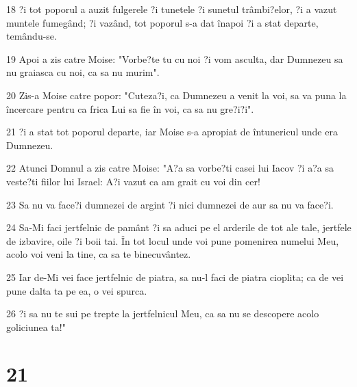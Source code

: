 \par 18 ?i tot poporul a auzit fulgerele ?i tunetele ?i sunetul trâmbi?elor, ?i a vazut muntele fumegând; ?i vazând, tot poporul s-a dat înapoi ?i a stat departe, temându-se.
\par 19 Apoi a zis catre Moise: "Vorbe?te tu cu noi ?i vom asculta, dar Dumnezeu sa nu graiasca cu noi, ca sa nu murim".
\par 20 Zis-a Moise catre popor: "Cuteza?i, ca Dumnezeu a venit la voi, sa va puna la încercare pentru ca frica Lui sa fie în voi, ca sa nu gre?i?i".
\par 21 ?i a stat tot poporul departe, iar Moise s-a apropiat de întunericul unde era Dumnezeu.
\par 22 Atunci Domnul a zis catre Moise: "A?a sa vorbe?ti casei lui Iacov ?i a?a sa veste?ti fiilor lui Israel: A?i vazut ca am grait cu voi din cer!
\par 23 Sa nu va face?i dumnezei de argint ?i nici dumnezei de aur sa nu va face?i.
\par 24 Sa-Mi faci jertfelnic de pamânt ?i sa aduci pe el arderile de tot ale tale, jertfele de izbavire, oile ?i boii tai. În tot locul unde voi pune pomenirea numelui Meu, acolo voi veni la tine, ca sa te binecuvântez.
\par 25 Iar de-Mi vei face jertfelnic de piatra, sa nu-l faci de piatra cioplita; ca de vei pune dalta ta pe ea, o vei spurca.
\par 26 ?i sa nu te sui pe trepte la jertfelnicul Meu, ca sa nu se descopere acolo goliciunea ta!"

\chapter{21}

